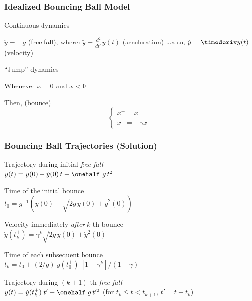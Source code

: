 \documentclass[12pt]{beamer}
\begin{document}
\begin{frame}
\frametitle{Idealized Bouncing Ball Model}

\begin{block}{Continuous dynamics}
\begin{itemize}
\vitem
$\ddot y = -g$ (free fall), where:
\vitem
$\ddot y = \frac{d^2}{dt^2} y(t)$ (acceleration)
\vitem
...also, $\dot y = \timederiv y(t)$ (velocity)
\end{itemize}
\end{block}

\begin{block}{``Jump'' dynamics}
\begin{itemize}
\vitem
Whenever $x = 0$ and $\dot x < 0$

\vitem
Then, (bounce)
\[
\begin{cases}
x^+ = x	\\
\dot x^+ = -\gamma \dot x
\end{cases}
\]
\end{itemize}
\end{block}

\end{frame}




\begin{frame}
\frametitle{Bouncing Ball Trajectories (Solution)}
\fontsize{10pt}{7.2}\selectfont
\begin{itemize}
\vitem
Trajectory during initial \emph{free-fall} \\
$y(t) = y(0) + \dot y(0) \, t - \onehalf \ g \, t^2$

\vitem
Time of the initial bounce \\
$t_0 = g^{-1} \left( \dot y(0) + \sqrt{ 2g \, y(0) + \dot y^2(0)} \right)$

\vitem
Velocity immediately \emph{after} $k$-th bounce \\
$\dot y(t_k^+) = \gamma^k \sqrt{ 2g \, y(0) + \dot y^2(0) }$

\vitem
Time of each subsequent bounce \\
$t_k = t_0 + (2/g) \ \dot y(t_0^+) \ [1-\gamma^k ]/(1-\gamma)$

\vitem Trajectory during $(k+1)$-th \emph{free-fall} \\
$y(t) = \dot y(t_k^+) \ t' - \onehalf \ g \, t'^2$ \hfill (for $t_k \leq t < t_{k+1}$, $t' = t - t_k$)

\end{itemize}

\end{frame}
\end{document}
